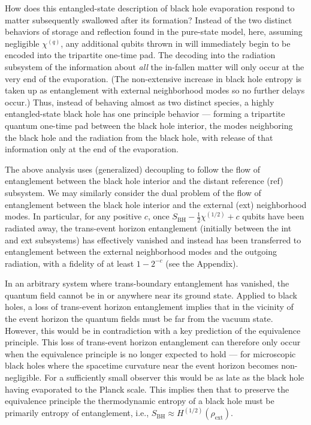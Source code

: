 \documentclass[aps,12pt]{revtex4}
\begin{document}
How does this entangled-state description of black hole evaporation
respond to matter subsequently swallowed after its formation? Instead
of the two distinct behaviors of storage and reflection found in the
pure-state model, here, assuming negligible $\chi^{(q)}$, any additional
qubits thrown in will immediately begin to be encoded into the tripartite
one-time pad.  The decoding into the radiation subsystem of the
information about {\it all\/} the in-fallen matter will only occur at 
the very end of the evaporation. (The non-extensive increase in black 
hole entropy is taken up as entanglement with external neighborhood 
modes so no further delays occur.) Thus, instead of behaving almost
as two distinct species, a highly entangled-state black hole has one
principle behavior --- forming a tripartite quantum one-time pad
between the black hole interior, the modes neighboring the black hole
and the radiation from the black hole, with release of that information
only at the end of the evaporation.

The above analysis uses (generalized) decoupling to follow the flow
of entanglement between the black hole interior and the distant reference
(ref) subsystem. We may similarly consider the dual problem of the
flow of entanglement between the black hole interior and the external (ext)
neighborhood modes. In particular, for any positive $c$, once
$S_{\text{BH}}-\frac{1}{2}\chi^{(1/2)} +c$ qubits have been
radiated away, the trans-event horizon entanglement (initially
between the int and ext subsystems) has effectively vanished and
instead has been transferred to entanglement between the
external neighborhood modes and the outgoing radiation, with
a fidelity of at least $1-2^{-c}$ (see the Appendix).

In an arbitrary system where trans-boundary entanglement has vanished,
the quantum field cannot be in or anywhere near its ground state.
Applied to black holes, a loss of trans-event horizon entanglement
implies that in the vicinity of the event horizon the quantum fields
must be far from the vacuum state. However, this would be in contradiction
with a key prediction of the equivalence principle. This loss of
trans-event horizon entanglement can therefore only occur when 
the equivalence principle is no longer expected to hold --- for
microscopic black holes where the spacetime curvature near the event
horizon becomes non-negligible. For a sufficiently small observer this
would be as late as the black hole having evaporated to the Planck scale.
This implies then that to preserve the equivalence principle the
thermodynamic entropy of a black hole must be primarily entropy of
entanglement, i.e., $S_{\text{BH}}\approx H^{(1/2)}(\rho_{\text{ext}})$.
\end{document}
